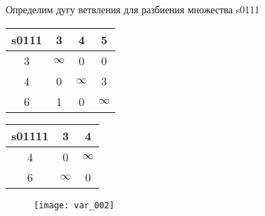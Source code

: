 \documentclass[a4paper,10pt]{article} %
\begin{document}
\newpage


Определим дугу ветвления для разбиения множества  s0111\\
\begin{flushleft}\begin{tabular}[]{|c|c|c|c|}
\hline
s0111 & 3 & 4 & 5\\
\hline
3 & $\infty$ &      0 &      0\\
\hline
4 &      0 & $\infty$ &      3\\
\hline
6 &      1 &      0 & $\infty$\\
\hline
\end{tabular}
\end{flushleft}


\begin{table}[ht]
\hfill
{}
\end{table}


\begin{tabular}[]{|c|c|c|}
\hline
s01111 & 3 & 4\\
\hline
4 &      0 & $\infty$\\
\hline
6 &  \cellcolor{yellow}$\infty$ &      0\\
\hline
\end{tabular}

\newpage


\begin{figure}[!h]
    \centering
    \texttt{[image: var\_002]}
\end{figure}
\end{document}
